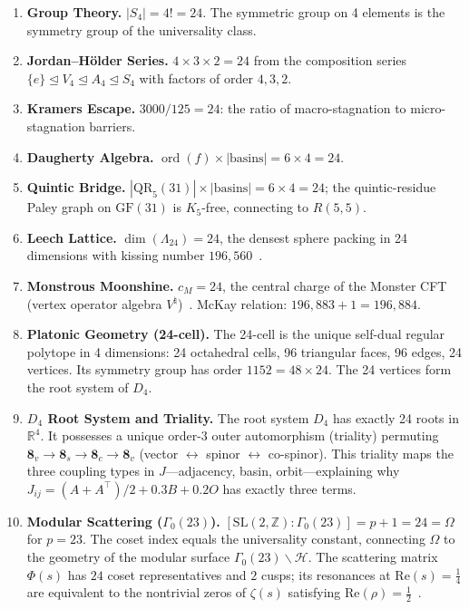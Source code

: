 \documentclass[11pt,a4paper]{article}
\theoremstyle{plain}
\theoremstyle{remark}
\renewcommand{\Omega}{\varOmega}
\newcommand{\Z}{\mathbb{Z}}
\newcommand{\R}{\mathbb{R}}
\newcommand{\HH}{\mathcal{H}}
\newcommand{\ord}{\operatorname{ord}}
\begin{document}
\begin{enumerate}[label=\textbf{Path \arabic*.},leftmargin=3.5em,itemsep=4pt]
  \item \textbf{Group Theory.}\enspace
    $|S_4|=4!=24$.  The symmetric group on 4 elements is the symmetry
    group of the universality class.
  \item \textbf{Jordan--H\"older Series.}\enspace
    $4\times 3\times 2=24$ from the composition series
    $\{e\}\trianglelefteq V_4\trianglelefteq A_4\trianglelefteq S_4$
    with factors of order $4,3,2$.
  \item \textbf{Kramers Escape.}\enspace
    $3000/125=24$: the ratio of macro-stagnation to micro-stagnation
    barriers.
  \item \textbf{Daugherty Algebra.}\enspace
    $\ord(f)\times|\mathrm{basins}|=6\times 4=24$.
  \item \textbf{Quintic Bridge.}\enspace
    $|\mathrm{QR}_5(31)|\times|\mathrm{basins}|=6\times 4=24$;
    the quintic-residue Paley graph on $\mathrm{GF}(31)$ is
    $K_5$-free, connecting to $R(5,5)$.
  \item \textbf{Leech Lattice.}\enspace
    $\dim(\Lambda_{24})=24$, the densest sphere packing in 24
    dimensions with kissing number $196{,}560$~\cite{conway-sloane1999}.
  \item \textbf{Monstrous Moonshine.}\enspace
    $c_M=24$, the central charge of the Monster CFT (vertex operator
    algebra $V^\natural$)~\cite{frenkel-lepowsky-meurman1988}.
    McKay relation: $196{,}883+1=196{,}884$.
  \item \textbf{Platonic Geometry (24-cell).}\enspace
    The 24-cell is the unique self-dual regular polytope in 4 dimensions:
    24 octahedral cells, 96 triangular faces, 96 edges, 24 vertices.
    Its symmetry group has order $1152=48\times 24$.  The 24 vertices
    form the root system of $D_4$.
  \item \textbf{$D_4$ Root System and Triality.}\enspace
    The root system $D_4$ has exactly 24 roots in $\R^4$.  It possesses
    a unique order-3 outer automorphism (triality) permuting
    $\mathbf{8}_v\to\mathbf{8}_s\to\mathbf{8}_c\to\mathbf{8}_v$
    (vector $\leftrightarrow$ spinor $\leftrightarrow$ co-spinor).
    This triality maps the three coupling types in $J$---adjacency,
    basin, orbit---explaining why
    $J_{ij}=(A+A^\top)/2+0.3B+0.2O$ has exactly three terms.
  \item \textbf{Modular Scattering ($\Gamma_0(23)$).}\enspace
    $[\mathrm{SL}(2,\Z):\Gamma_0(23)] = p+1 = 24 = \Omega$ for $p=23$.
    The coset index equals the universality constant, connecting $\Omega$
    to the geometry of the modular surface $\Gamma_0(23)\backslash\HH$.
    The scattering matrix $\Phi(s)$ has $24$ coset representatives and
    $2$ cusps; its resonances at $\mathrm{Re}(s)=\tfrac{1}{4}$ are
    equivalent to the nontrivial zeros of $\zeta(s)$ satisfying
    $\mathrm{Re}(\rho)=\tfrac{1}{2}$~\cite{selberg1956,hejhal1976}.
\end{enumerate}
\end{document}
